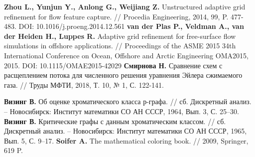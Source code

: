 \begin{thebibliography}{99}
%
\textbf{Zhou L., Yunjun Y., Anlong G., Weijiang Z.} Unstructured adaptive grid refinement for flow feature capture. // Procedia Engineering, 2014, 99, P. 477-483. DOI: 10.1016/j.proeng.2014.12.561
%
\textbf{van der Plas P., Veldman A., van der Heiden H., Luppes R.} Adaptive grid refinement for free-surface flow simulations in offshore applications. // Proceedings of the ASME 2015 34th International Conference on Ocean, Offshore and Arctic Engineering OMA2015, 2015. DOI: 10.1115/OMAE2015-42029
%
\textbf{Смирнова Н.} Сравнение схем с расщеплением потока для численного решения уравнения Эйлера сжимаемого газа. // Труды МФТИ, 2018, Т. 10, № 1, С. 122-141.
%









%
\textbf{Визинг В.} Об оценке хроматического класса р-графа. // сб. Дискретный анализ. -- Новосибирск: Институт математики СО АН СССР, 1964, Вып. 3, С. 25–30.
%
\textbf{Визинг В.} Критические графы с данным хроматическим классом. // сб. Дискретный анализ. -- Новосибирск: Институт математики СО АН СССР, 1965, Вып. 5, С. 9–17.
%
\textbf{Soifer A.} The mathematical coloring book. // 2009, Springer, 619 P.
%







\end{thebibliography}
